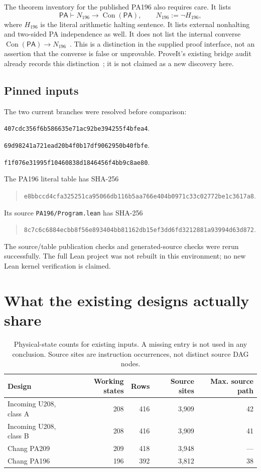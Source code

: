 \documentclass[11pt,letterpaper]{article}
\newcommand{\PA}{\mathsf{PA}}
\newcommand{\Con}{\operatorname{Con}}
\newcommand{\file}[1]{\texttt{\nolinkurl{#1}}}
\begin{document}
The theorem inventory for the published PA196 also requires care. It lists
\[
 \PA\vdash N_{196}\to\Con(\PA),\qquad N_{196}:=\neg H_{196},
\]
where $H_{196}$ is the literal arithmetic halting sentence. It lists external
nonhalting and two-sided PA independence as well. It does not list the
internal converse $\Con(\PA)\to N_{196}$~\cite{jresult,jind}.
This is a distinction in the supplied proof interface, not an assertion that
the converse is false or unprovable. ProveIt's existing bridge audit already
records this distinction~\cite{bridge}; it is not claimed as a new discovery
here.

\subsection{Pinned inputs}

The two current branches were resolved before comparison:
\begin{description}[style=nextline]
\item[James Chang, PA196]
\file{407cdc356f6b586635e71ac92be394255f4bfea4}.
\item[James Chang, requested PA209 predecessor]
\file{69d98241a721ead20b4f0b17df9062950b40fbfe}.
\item[ProveIt, incoming designs and ConciseIPRA]
\file{f1f076e31995f10460838d1846456f4bb9c8ae80}.
\end{description}
The PA196 literal table has SHA-256
\begin{quote}\small
\nolinkurl{e8bbccd4cfa325251ca95066db116b5aa766e404b0971c33c02772be1c3617a8}.
\end{quote}
Its source \file{PA196/Program.lean} has SHA-256
\begin{quote}\small
\nolinkurl{8c7c6c6884ecbb8f56e893404bb81162db15ef3dd6fd3212881a93994d63d872}.
\end{quote}
The source/table publication checks and generated-source checks were rerun
successfully. The full Lean project was not rebuilt in this environment;
no new Lean kernel verification is claimed.

\section{What the existing designs actually share}

\begin{table}[ht]
\centering
\begin{tabular}{@{}lrrrr@{}}
\toprule
Design & Working states & Rows & Source sites & Max. source path\\
\midrule
Incoming U208, class A & 208 & 416 & 3,909 & 42\\
Incoming U208, class B & 208 & 416 & 3,909 & 41\\
Chang PA209 & 209 & 418 & 3,948 & ---\\
Chang PA196 & 196 & 392 & 3,812 & 38\\
\bottomrule
\end{tabular}
\caption{Physical-state counts for existing inputs. A missing entry is not
used in any conclusion. Source sites are instruction occurrences, not
distinct source DAG nodes.}
\label{tab:old}
\end{table}
\end{document}

